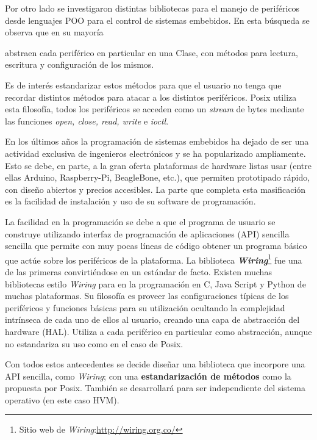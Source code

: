 \medskip

Por otro lado se investigaron distintas bibliotecas para el manejo de periféricos desde lenguajes POO para el control de sistemas embebidos. En esta búsqueda se observa que en su mayoría



 abstraen cada periférico en particular en una Clase, con métodos para lectura, escritura y configuración de los mismos. 

\medskip

Es de interés estandarizar estos métodos para que el usuario no tenga que recordar distintos métodos para atacar a los distintos periféricos. Posix utiliza esta filosofía, todos los periféricos se acceden como un \textit{stream} de bytes mediante las funciones \textit{open, close, read, write} e \textit{ioctl}.




En los últimos años la programación de sistemas embebidos ha dejado de ser una actividad exclusiva de ingenieros electrónicos y se ha popularizado ampliamente. Esto se debe, en parte, a la gran oferta plataformas de hardware listas usar (entre ellas Arduino, Raspberry-Pi, BeagleBone, etc.), que permiten  prototipado rápido, con diseño abiertos y precios accesibles. La parte que completa esta masificación es la facilidad de instalación y uso de su software de programación.

\medskip

La facilidad en la programación se debe a que el programa de usuario se construye utilizando interfaz de programación de aplicaciones (API) sencilla sencilla que permite con muy pocas líneas de código obtener un programa básico que actúe sobre los periféricos de la plataforma. La biblioteca \textbf{\textit{Wiring}}\footnote{Sitio web de \textit{Wiring}:\url{http://wiring.org.co/}} fue una de las primeras convirtiéndose en un estándar de facto. Existen muchas bibliotecas estilo \textit{Wiring} para en la programación en C, Java Script y Python de muchas plataformas. Su filosofía es proveer las configuraciones típicas de los periféricos y funciones básicas para su utilización ocultando la complejidad intrínseca de cada uno de ellos al usuario, creando una capa de abstracción del hardware (HAL). Utiliza a cada periférico en particular como abstracción, aunque no estandariza su uso como en el caso de Posix.

\medskip

Con todos estos antecedentes se decide diseñar una biblioteca que incorpore una API sencilla, como \textit{Wiring}; con una \textbf{estandarización de métodos} como la propuesta por Posix.
También se desarrollará para ser independiente del sistema operativo (en este caso HVM).